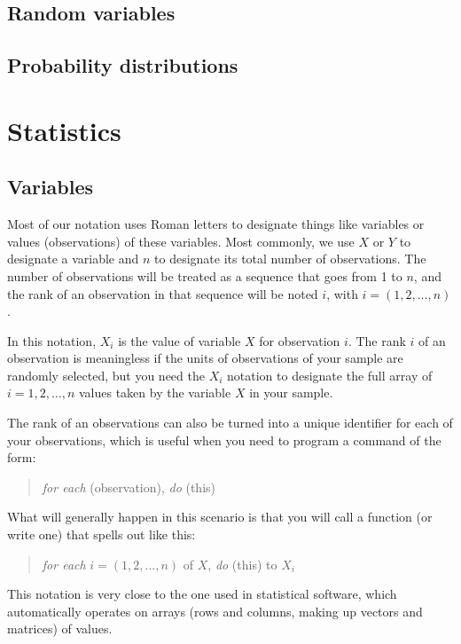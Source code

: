   \subsection{Random variables}

  \subsection{Probability distributions}

\section{Statistics}

\subsection{Variables}%
%
Most of our notation uses Roman letters to designate things like variables or values (observations) of these variables. Most commonly, we use $X$ or $Y$ to designate a variable and $n$ to designate its total number of observations. The number of observations will be treated as a sequence that goes from 1 to $n$, and the rank of an observation in that sequence will be noted $i$, with $i = (1,2, \ldots, n)$.%

In this notation, $X_i$ is the value of variable $X$ for observation $i$. The rank $i$ of an observation is meaningless if the units of observations of your sample are randomly selected, but you need the $X_i$ notation to designate the full array of $i = 1,2, \ldots, n$ values taken by the variable $X$ in your sample. %

The rank of an observations can also be turned into a unique identifier for each of your observations, which is useful when you need to program a command of the form:%

\begin{quote}
	\emph{for each} (observation), \emph{do} (this)
\end{quote}

What will generally happen in this scenario is that you will call a function (or write one) that spells out like this:

\begin{quote}
	\emph{for each} $i = (1,2, \ldots, n)$ of $X$, \emph{do} (this) to $X_i$
\end{quote}

This notation is very close to the one used in statistical software, which automatically operates on arrays (rows and columns, making up vectors and matrices) of values.%

